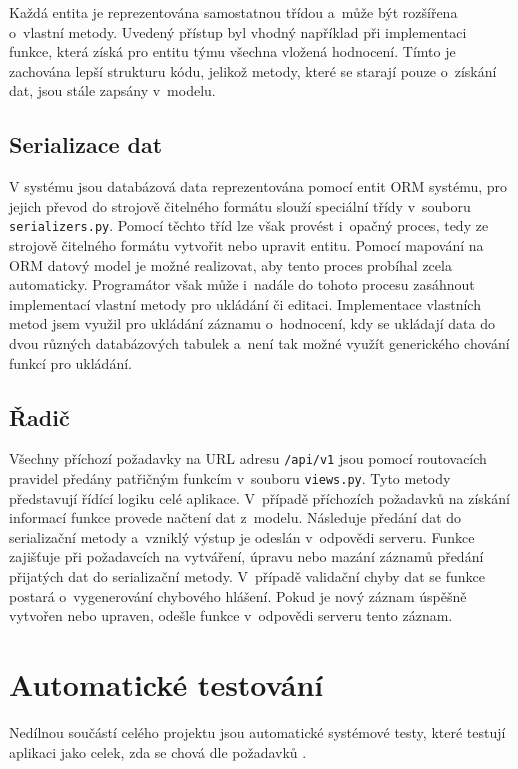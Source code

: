 \documentclass[
  digital,
  twoside,
  table, 
  nolof, 
  nolot
]{fithesis3}
\begin{document}
Každá entita je reprezentována samostatnou třídou a~může být rozšířena o~vlastní metody. Uvedený přístup byl vhodný například při implementaci funkce, která získá pro entitu týmu všechna vložená hodnocení. Tímto je zachována lepší strukturu kódu, jelikož metody, které se starají pouze o~získání dat, jsou stále zapsány v~modelu.

\subsection{Serializace dat}
\label{serializer}
V systému jsou databázová data reprezentována pomocí entit ORM systému, pro jejich převod do strojově čitelného formátu slouží speciální třídy v~souboru \texttt{serializers.py}. Pomocí těchto tříd lze však provést i~opačný proces, tedy ze strojově čitelného formátu vytvořit nebo upravit entitu. Pomocí mapování na ORM datový model je možné realizovat, aby tento proces probíhal zcela automaticky. Programátor však může i~nadále do tohoto procesu zasáhnout implementací vlastní metody pro ukládání či editaci. Implementace vlastních metod jsem využil pro ukládání záznamu o~hodnocení, kdy se ukládají data do dvou různých databázových tabulek a~není tak možné využít generického chování funkcí pro ukládání.

\subsection{Řadič}
\label{radic}
Všechny příchozí požadavky na URL adresu \texttt{/api/v1} jsou pomocí routovacích pravidel předány patřičným funkcím v~souboru \texttt{views.py}. Tyto metody představují řídící logiku celé aplikace. V~případě příchozích požadavků na získání informací funkce provede načtení dat z~modelu. Následuje předání dat do serializační metody a~vzniklý výstup je odeslán v~odpovědi serveru. Funkce zajišťuje při požadavcích na vytváření, úpravu nebo mazání záznamů předání přijatých dat do serializační metody. V~případě validační chyby dat se funkce postará o~vygenerování chybového hlášení. Pokud je nový záznam úspěšně vytvořen nebo upraven, odešle funkce v~odpovědi serveru tento záznam.

\section{Automatické testování}

Nedílnou součástí celého projektu jsou automatické systémové testy, které testují aplikaci jako celek, zda se chová dle požadavků \cite{difSysTest}.
\end{document}
